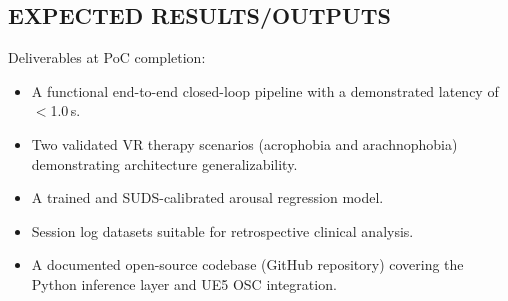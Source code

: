 \documentclass[conference]{IEEEtran}
\begin{document}
\subsection{EXPECTED RESULTS/OUTPUTS}

Deliverables at PoC completion:

\begin{itemize}
    \item A functional end-to-end closed-loop pipeline with a demonstrated latency of $<$1.0\,s.
    \item Two validated VR therapy scenarios (acrophobia and arachnophobia) demonstrating architecture generalizability.
    \item A trained and SUDS-calibrated arousal regression model.
    \item Session log datasets suitable for retrospective clinical analysis.
    \item A documented open-source codebase (GitHub repository) covering the Python inference layer and UE5 OSC integration.
\end{itemize}

\newpage


\end{document}
